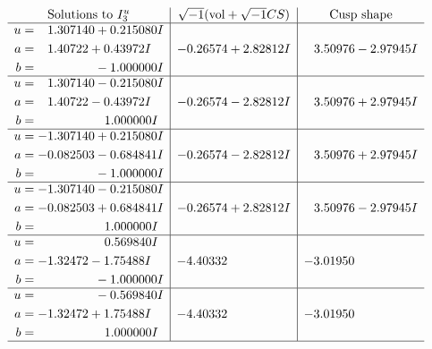 \documentclass[1p]{elsarticle_modified}
\theoremstyle{definition}
\newcommand{\I}{\sqrt{-1}}
\begin{document}
$$\begin{array}{c|c|c}  
\text{Solutions to }I^u_{3}& \I (\text{vol} + \sqrt{-1}CS) & \text{Cusp shape}\\
 \hline 
\begin{aligned}
u &= \phantom{-}1.307140 + 0.215080 I \\
a &= \phantom{-}1.40722 + 0.43972 I \\
b &= \phantom{-0.000000 } -1.000000 I\end{aligned}
 & -0.26574 + 2.82812 I & \phantom{-}3.50976 - 2.97945 I \\ \hline\begin{aligned}
u &= \phantom{-}1.307140 - 0.215080 I \\
a &= \phantom{-}1.40722 - 0.43972 I \\
b &= \phantom{-0.000000 -}1.000000 I\end{aligned}
 & -0.26574 - 2.82812 I & \phantom{-}3.50976 + 2.97945 I \\ \hline\begin{aligned}
u &= -1.307140 + 0.215080 I \\
a &= -0.082503 - 0.684841 I \\
b &= \phantom{-0.000000 } -1.000000 I\end{aligned}
 & -0.26574 - 2.82812 I & \phantom{-}3.50976 + 2.97945 I \\ \hline\begin{aligned}
u &= -1.307140 - 0.215080 I \\
a &= -0.082503 + 0.684841 I \\
b &= \phantom{-0.000000 -}1.000000 I\end{aligned}
 & -0.26574 + 2.82812 I & \phantom{-}3.50976 - 2.97945 I \\ \hline\begin{aligned}
u &= \phantom{-0.000000 -}0.569840 I \\
a &= -1.32472 - 1.75488 I \\
b &= \phantom{-0.000000 } -1.000000 I\end{aligned}
 & -4.40332\phantom{ +0.000000I} & -3.01950\phantom{ +0.000000I} \\ \hline\begin{aligned}
u &= \phantom{-0.000000 } -0.569840 I \\
a &= -1.32472 + 1.75488 I \\
b &= \phantom{-0.000000 -}1.000000 I\end{aligned}
 & -4.40332\phantom{ +0.000000I} & -3.01950\phantom{ +0.000000I}\\
 \hline 
 \end{array}$$\newpage
\end{document}
